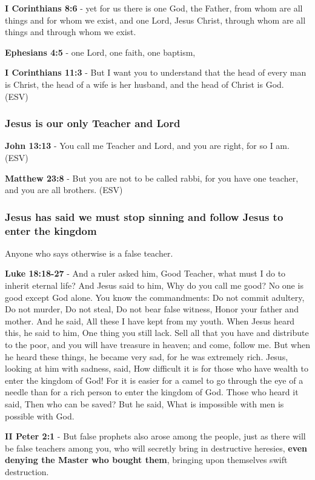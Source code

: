 \documentclass[11pt]{article}
\begin{document}
\textbf{I Corinthians 8:6} - yet for us there is one God, the Father, from whom are all things and for whom we exist, and one Lord, Jesus Christ, through whom are all things and through whom we exist.

\textbf{Ephesians 4:5} - one Lord, one faith, one baptism,

\textbf{I Corinthians 11:3} - But I want you to understand that the head of every man is Christ, the head of a wife is her husband, and the head of Christ is God. (ESV)

\subsubsection{Jesus is our only Teacher and Lord}
\label{sec:org3cae4de}
\textbf{John 13:13} - You call me Teacher and Lord, and you are right, for so I am. (ESV)

\textbf{Matthew 23:8} - But you are not to be called rabbi, for you have one teacher, and you are all brothers. (ESV)

\subsubsection{Jesus has said we must stop sinning and follow Jesus to enter the kingdom}
\label{sec:org7cd9ee8}
Anyone who says otherwise is a false teacher.

\textbf{Luke 18:18-27} - And a ruler asked him, Good Teacher, what must I do to inherit eternal life? And Jesus said to him, Why do you call me good? No one is good except God alone. You know the commandments: Do not commit adultery, Do not murder, Do not steal, Do not bear false witness, Honor your father and mother. And he said, All these I have kept from my youth. When Jesus heard this, he said to him, One thing you still lack. Sell all that you have and distribute to the poor, and you will have treasure in heaven; and come, follow me. But when he heard these things, he became very sad, for he was extremely rich. Jesus, looking at him with sadness, said, How difficult it is for those who have wealth to enter the kingdom of God! For it is easier for a camel to go through the eye of a needle than for a rich person to enter the kingdom of God. Those who heard it said, Then who can be saved? But he said, What is impossible with men is possible with God.

\textbf{II Peter 2:1} - But false prophets also arose among the people, just as there will be false teachers among you, who will secretly bring in destructive heresies, \textbf{even denying the Master who bought them}, bringing upon themselves swift destruction.
\end{document}
